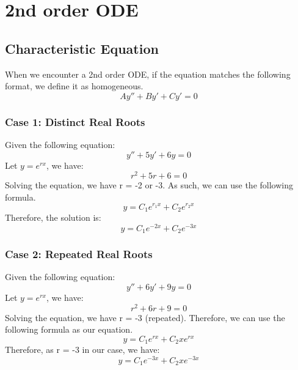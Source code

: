 \documentclass{article}
\begin{document}
\section{2nd order ODE}
\subsection{Characteristic Equation}
When we encounter a 2nd order ODE, if the equation matches the following format, we define it as homogeneous.
\begin{equation*}
	Ay''+By'+Cy' = 0
\end{equation*}
\subsubsection{Case 1: Distinct Real Roots}
Given the following equation:
\begin{equation*}
	y''+5y'+6y=0
\end{equation*}
Let $y = e^{rx}$, we have:\\
\begin{equation*}
	r^2+5r+6=0
\end{equation*}
Solving the equation, we have r = -2 or -3.
As such, we can use the following formula.
\begin{equation*}
	y = C_1e^{r_1x}+C_2e^{r_2x}
\end{equation*}
Therefore, the solution is:
\begin{equation*}
	y = C_1e^{-2x} + C_2e^{-3x}
\end{equation*}
\subsubsection{Case 2: Repeated Real Roots}
Given the following equation:
\begin{equation*}
	y''+6y'+9y=0
\end{equation*}
Let $y = e^{rx}$, we have:\\
\begin{equation*}
	r^2+6r+9=0
\end{equation*}
Solving the equation, we have r = -3 (repeated). Therefore, we can use the following formula as our equation.
\begin{equation*}
	y = C_1e^{rx}+C_2xe^{rx}
\end{equation*}
Therefore, as r = -3 in our case, we have:
\begin{equation*}
	y = C_1e^{-3x}+C_2xe^{-3x}
\end{equation*}
\end{document}
